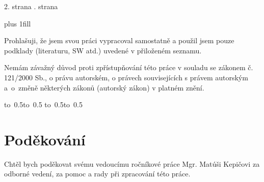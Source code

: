 \pagestyle{empty}
\hypersetup{pageanchor=false}

\maketitle

\openright
\hypersetup{pageanchor=true}
\pagestyle{plain}

2. strana
. strana
\newpage


\vglue 0pt plus 1fill


\noindent
Prohlašuji, že jsem svou práci vypracoval samostatně a použil jsem pouze podklady (literaturu, SW atd.) uvedené v přiloženém seznamu.

\medskip\noindent
Nemám závažný důvod proti zpřístupňování této práce v souladu se zákonem č. 121/2000 Sb., o právu autorském, o právech souvisejících s právem autorským a~o~změně některých zákonů (autorský zákon) v platném znění.

\vspace{10mm}

\hbox{\hbox to 0.5\hbox to 0.5\hsize{\dotfill\quad}}
\smallskip
\hbox{\hbox to 0.5\hsize{}\hbox to 0.5}

\vspace{20mm}
\newpage

\openright

\noindent %
\section*{Poděkování}
Chtěl bych poděkovat svému vedoucímu ročníkové práce Mgr. Matúši Kepičovi za odborné vedení, za pomoc a rady při zpracování této práce.


\tableofcontents

\openright
\pagestyle{plain}
\setcounter{page}{6}